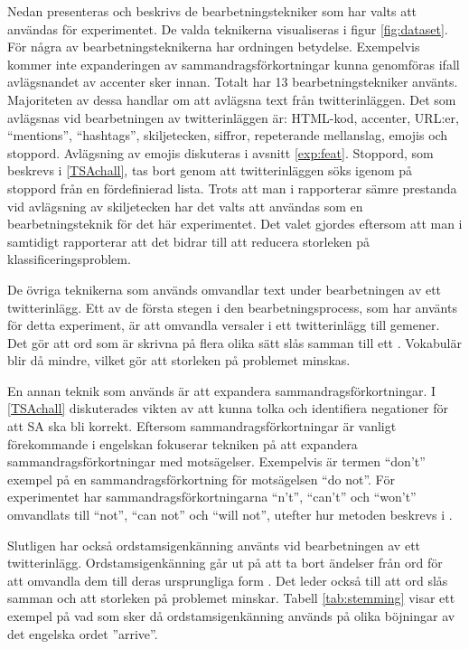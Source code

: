 \documentclass{kaumasters} %
\begin{document}
Nedan presenteras och beskrivs de bearbetningstekniker som har valts att användas för experimentet. De valda teknikerna visualiseras i figur \ref{fig:dataset}. För några av bearbetningsteknikerna har ordningen betydelse. Exempelvis kommer inte expanderingen av sammandragsförkortningar kunna genomföras ifall avlägsnandet av accenter sker innan. Totalt har 13 bearbetningstekniker använts. Majoriteten av dessa handlar om att avlägsna text från twitterinläggen. Det som avlägsnas vid bearbetningen av twitterinläggen är: HTML-kod, accenter, URL:er, “mentions”, “hashtags”, skiljetecken, siffror, repeterande mellanslag, emojis och stoppord. Avlägsning av emojis diskuteras i avsnitt \ref{exp:feat}. Stoppord, som beskrevs i \ref{TSAchall}, tas bort genom att twitterinläggen söks igenom på stoppord från en fördefinierad lista. Trots att man i \cite{effrosynidis2017comparison} rapporterar sämre prestanda vid avlägsning av skiljetecken har det valts att användas som en bearbetningsteknik för det här experimentet. Det valet gjordes eftersom att man i \cite{effrosynidis2017comparison} samtidigt rapporterar att det bidrar till att reducera storleken på klassificeringsproblem. 

De övriga teknikerna som används omvandlar text under bearbetningen av ett twitterinlägg. Ett av de första stegen i den bearbetningsprocess, som har använts för detta experiment, är att omvandla versaler i ett twitterinlägg till gemener. Det gör att ord som är skrivna på flera olika sätt slås samman till ett \cite{effrosynidis2017comparison}. Vokabulär blir då mindre, vilket gör att storleken på problemet minskas.

En annan teknik som används är att expandera sammandragsförkortningar. I \ref{TSAchall} diskuterades vikten av att kunna tolka och identifiera negationer för att SA ska bli korrekt. Eftersom sammandragsförkortningar är vanligt förekommande i engelskan fokuserar tekniken på att expandera sammandragsförkortningar med motsägelser. Exempelvis är termen “don’t” exempel på en sammandragsförkortning för motsägelsen “do not”. För experimentet har sammandragsförkortningarna “n’t”, “can’t” och “won’t” omvandlats till “not”, “can not” och “will not”, utefter hur metoden beskrevs i \cite{7862202}.

Slutligen har också ordstamsigenkänning använts vid bearbetningen av ett twitterinlägg. Ordstamsigenkänning går ut på att ta bort ändelser från ord för att omvandla dem till deras ursprungliga form \cite{effrosynidis2017comparison}. Det leder också till att ord slås samman och att storleken på problemet minskar. Tabell \ref{tab:stemming} visar ett exempel på vad som sker då ordstamsigenkänning används på olika böjningar av det engelska ordet ''arrive''.
\end{document}
